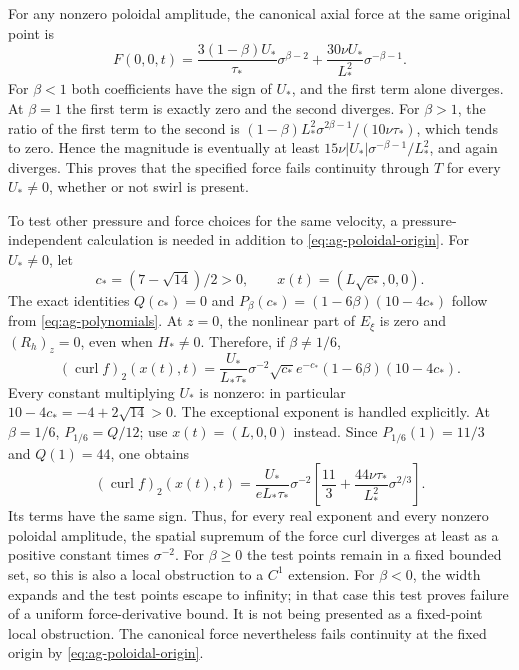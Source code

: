 For any nonzero poloidal amplitude, the canonical axial force at the
same original point is
\begin{equation}\label{eq:ag-poloidal-origin}
 F(0,0,t)=\frac{3(1-\beta)U_*}{\tau_*}\sigma^{\beta-2}
                +\frac{30\nu U_*}{L_*^2}\sigma^{-\beta-1}.
\end{equation}
For \(\beta<1\) both coefficients have the sign of \(U_*\), and
the first term alone diverges.  At \(\beta=1\) the first term is
exactly zero and the second diverges.  For \(\beta>1\), the ratio
of the first term to the second is
\((1-\beta)L_*^2\sigma^{2\beta-1}/(10\nu\tau_*)\), which tends
to zero.  Hence the magnitude is eventually at least
\(15\nu|U_*|\sigma^{-\beta-1}/L_*^2\), and again diverges.
This proves that the specified force fails continuity through \(T\)
for every \(U_*\ne0\), whether or not swirl is present.

To test other pressure and force choices for the same velocity, a
pressure-independent calculation is needed in addition to
\eqref{eq:ag-poloidal-origin}.  For \(U_*\ne0\), let
\[
 c_*=(7-\sqrt{14})/2>0,
 \qquad x(t)=(L\sqrt{c_*},0,0).
\]
The exact identities
\(Q(c_*)=0\) and
\(P_\beta(c_*)=(1-6\beta)(10-4c_*)\) follow from
\eqref{eq:ag-polynomials}.  At \(z=0\), the nonlinear part of
\(E_\xi\) is zero and \((R_h)_z=0\), even when \(H_*\ne0\).
Therefore, if \(\beta\ne1/6\),
\begin{equation}\label{eq:ag-uniform-curl-test}
 (\operatorname{curl}f)_2(x(t),t)
 =\frac{U_*}{L_*\tau_*}\sigma^{-2}\sqrt{c_*}e^{-c_*}
             (1-6\beta)(10-4c_*).
\end{equation}
Every constant multiplying \(U_*\) is nonzero: in particular
\(10-4c_*=-4+2\sqrt{14}>0\).
The exceptional exponent is handled explicitly.  At \(\beta=1/6\),
\(P_{1/6}=Q/12\); use \(x(t)=(L,0,0)\) instead.  Since
\(P_{1/6}(1)=11/3\) and \(Q(1)=44\), one obtains
\begin{equation}\label{eq:ag-exceptional-curl-test}
 (\operatorname{curl}f)_2(x(t),t)
 =\frac{U_*}{e L_*\tau_*}\sigma^{-2}
       \left[\frac{11}{3}+\frac{44\nu\tau_*}{L_*^2}\sigma^{2/3}\right].
\end{equation}
Its terms have the same sign.  Thus, for every real exponent and every
nonzero poloidal amplitude, the spatial supremum of the force curl
diverges at least as a positive constant times \(\sigma^{-2}\).
For \(\beta\geq0\) the test points remain in a fixed bounded set,
so this is also a local obstruction to a \(C^1\) extension.  For
\(\beta<0\), the width expands and the test points escape to infinity;
in that case this test proves failure of a uniform force-derivative
bound.  It is not being presented as a fixed-point local obstruction.
The canonical force nevertheless fails continuity at the fixed origin
by \eqref{eq:ag-poloidal-origin}.

